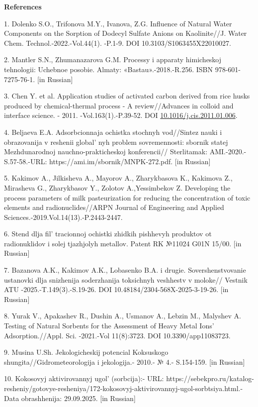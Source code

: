 \begin{center}
{\bfseries References}
\end{center}

\begin{refs}
1. Dolenko S.O., Trifonova M.Y., Ivanova, Z.G. Influence of Natural
Water Components on the Sorption of Dodecyl Sulfate Anions on
Kaolinite//J. Water Chem. Technol.-2022.-Vol.44(1). -P.1-9. DOI
10.3103/S1063455X22010027.

2. Mantler S.N., Zhumanazarova G.M. Processy i apparaty himicheskoj
tehnologii: Uchebnoe posobie. Almaty: «Bastau».-2018.-R.256. ISBN
978-601-7275-76-1. {[}in Russian{]}

3. Chen Y. et al. Application studies of activated carbon derived from
rice husks produced by chemical-thermal process - A review//Advances in
colloid and interface science. - 2011. -Vol.163(1).-P.39-52. DOI
\href{https://doi.org/10.1016/j.cis.2011.01.006}{10.1016/j.cis.2011.01.006}.

4. Beljaeva E.A. Adsorbcionnaja ochistka stochnyh vod//Sintez nauki i
obrazovanija v reshenii global' nyh problem
sovremennosti: sbornik statej Mezhdunarodnoj nauchno-prakticheskoj
konferencii// Sterlitamak: AMI.-2020.-S.57-58.-URL:
https://ami.im/sbornik/MNPK-272.pdf. {[}in Russian{]}

5. Kakimov A., Jilkisheva A., Mayorov A., Zharykbasova K., Kakimova Z.,
Mirasheva G., Zharykbasov Y., Zolotov A.,Yessimbekov Z. Developing the
process parameters of milk pasteurization for reducing the concentration
of toxic elements and radionuclides//ARPN Journal of Engineering and
Applied Sciences.-2019.Vol.14(13).-P.2443-2447.

6. Stend dlja fil' tracionnoj ochistki zhidkih pishhevyh
produktov ot radionuklidov i solej tjazhjolyh metallov. Patent RK №11024
G01N 15/00. {[}in Russian{]}

7. Bazanova A.K., Kakimov A.K., Lobasenko B.A. i drugie.
Sovershenstvovanie ustanovki dlja snizhenija soderzhanija toksichnyh
veshhestv v moloke// Vestnik ATU -2025.-T.149(3).-S.19-26. DOI
10.48184/2304-568X-2025-3-19-26. {[}in Russian{]}

8. Yurak V., Apakashev R., Dushin A., Usmanov A., Lebzin M., Malyshev A.
Testing of Natural Sorbents for the Assessment of Heavy Metal Ions'
Adsorption.//Appl. Sci. -2021.-Vol 11(8):3723. DOI 10.3390/app11083723.

9. Musina U.Sh. Jekologicheskij potencial Koksuskogo
shungita//Gidrometeorologija i jekologija.- 2010.- № 4.- S.154-159.
{[}in Russian{]}

10. Kokosovyj aktivirovannyj ugol'{} (sorbcija):- URL:
https://sebekpro.ru/katalog-resheniy/gotovye-resheniya/172-kokosovyj-aktivirovannyj-ugol-sorbtsiya.html.-
Data obrashhenija: 29.09.2025. {[}in Russian{]}
\end{refs}

